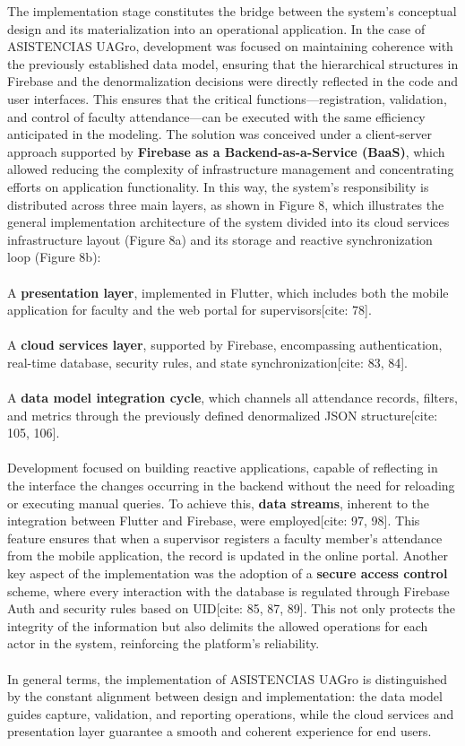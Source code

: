 \documentclass[journal=information,article,submit,pdftex,oneauthor]{Definitions/mdpi}
\begin{document}
The implementation stage constitutes the bridge between the system's conceptual design and its materialization into an operational application. In the case of ASISTENCIAS UAGro, development was focused on maintaining coherence with the previously established data model, ensuring that the hierarchical structures in Firebase and the denormalization decisions were directly reflected in the code and user interfaces. This ensures that the critical functions—registration, validation, and control of faculty attendance—can be executed with the same efficiency anticipated in the modeling. The solution was conceived under a client-server approach supported by \textbf{Firebase as a Backend-as-a-Service (BaaS)}, which allowed reducing the complexity of infrastructure management and concentrating efforts on application functionality. In this way, the system's responsibility is distributed across three main layers, as shown in Figure 8, which illustrates the general implementation architecture of the system divided into its cloud services infrastructure layout (Figure 8a) and its storage and reactive synchronization loop (Figure 8b):\\
\\
A \textbf{presentation layer}, implemented in Flutter, which includes both the mobile application for faculty and the web portal for supervisors[cite: 78].\\
\\
A \textbf{cloud services layer}, supported by Firebase, encompassing authentication, real-time database, security rules, and state synchronization[cite: 83, 84].\\
\\
A \textbf{data model integration cycle}, which channels all attendance records, filters, and metrics through the previously defined denormalized JSON structure[cite: 105, 106].\\
\\
Development focused on building reactive applications, capable of reflecting in the interface the changes occurring in the backend without the need for reloading or executing manual queries. To achieve this, \textbf{data streams}, inherent to the integration between Flutter and Firebase, were employed[cite: 97, 98]. This feature ensures that when a supervisor registers a faculty member's attendance from the mobile application, the record is updated in the online portal. Another key aspect of the implementation was the adoption of a \textbf{secure access control} scheme, where every interaction with the database is regulated through Firebase Auth and security rules based on UID[cite: 85, 87, 89]. This not only protects the integrity of the information but also delimits the allowed operations for each actor in the system, reinforcing the platform's reliability.\\
\\
In general terms, the implementation of ASISTENCIAS UAGro is distinguished by the constant alignment between design and implementation: the data model guides capture, validation, and reporting operations, while the cloud services and presentation layer guarantee a smooth and coherent experience for end users.\\
\end{document}
